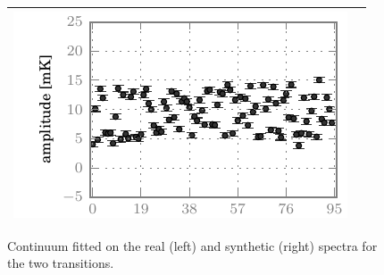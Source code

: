 \begin{figure}[b]
\begin{tabular}{@{}c@{}c@{}}
        \includegraphics{spread_98_base_ampl_noisy}            \\
    \bottomrule
    \end{tabular}
    \caption{
        Continuum fitted on the real (left) and synthetic (right) spectra for the two transitions.
    }
    \label{fig:fit_base}
\end{figure}

